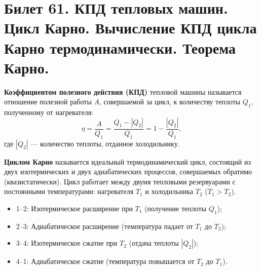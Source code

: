 \section{Билет 61. КПД тепловых машин. Цикл Карно. Вычисление КПД цикла Карно термодинамически. Теорема Карно.}

\begin{definition}
\textbf{Коэффициентом полезного действия (КПД)} тепловой машины называется отношение полезной работы $A$, совершаемой за цикл, к количеству теплоты $Q_1$, полученному от нагревателя:
\begin{equation}
    \eta = \frac{A}{Q_1} = \frac{Q_1 - |Q_2|}{Q_1} = 1 - \frac{|Q_2|}{Q_1}, \label{eq:efficiency_61}
\end{equation}
где $|Q_2|$ --- количество теплоты, отданное холодильнику.
\end{definition}

\begin{definition}
\textbf{Циклом Карно} называется идеальный термодинамический цикл, состоящий из двух изотермических и двух адиабатических процессов, совершаемых обратимо (квазистатически). Цикл работает между двумя тепловыми резервуарами с постоянными температурами: нагревателя $T_1$ и холодильника $T_2$ ($T_1 > T_2$).
\begin{itemize}
    \item 1--2: Изотермическое расширение при $T_1$ (получение теплоты $Q_1$);
    \item 2--3: Адиабатическое расширение (температура падает от $T_1$ до $T_2$);
    \item 3--4: Изотермическое сжатие при $T_2$ (отдача теплоты $|Q_2|$);
    \item 4--1: Адиабатическое сжатие (температура повышается от $T_2$ до $T_1$).
\end{itemize}
\end{definition}

